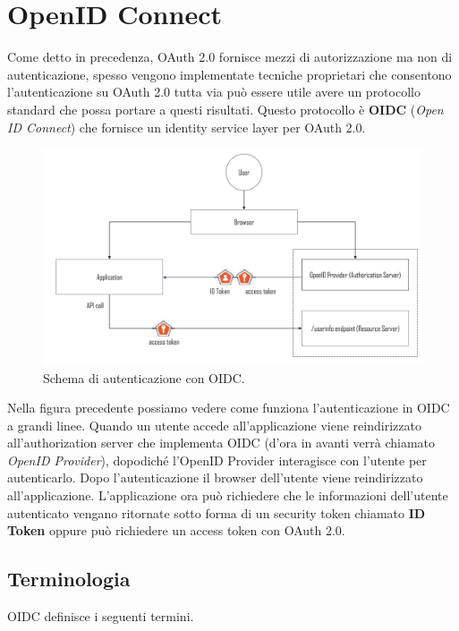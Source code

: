 \chapter{OpenID Connect}

Come detto in precedenza, OAuth 2.0 fornisce mezzi di autorizzazione ma non di
autenticazione, spesso vengono implementate tecniche proprietari che consentono
l'autenticazione su OAuth 2.0 tutta via può essere utile avere un protocollo standard
che possa portare a questi risultati.
Questo protocollo è \textbf{OIDC} (\textit{Open ID Connect}) che fornisce un identity service layer
per OAuth 2.0.

\begin{figure}[H]
    \centering
    \includegraphics[width=\textwidth, keepaspectratio]{capitoli/id_managing/imgs/oidc1.png}
    \caption{Schema di autenticazione con OIDC.}
\end{figure}

Nella figura precedente possiamo vedere come funziona l'autenticazione in OIDC a
grandi linee.
Quando un utente accede all'applicazione viene reindirizzato all'authorization server
che implementa OIDC (d'ora in avanti verrà chiamato \textit{OpenID Provider}),
dopodiché l'OpenID Provider interagisce con l'utente per autenticarlo.
Dopo l'autenticazione il browser dell'utente viene reindirizzato all'applicazione.
L'applicazione ora può richiedere che le informazioni dell'utente autenticato vengano
ritornate sotto forma di un security token chiamato \textbf{ID Token} oppure può
richiedere un access token con OAuth 2.0.

\section{Terminologia}

OIDC definisce i seguenti termini.

